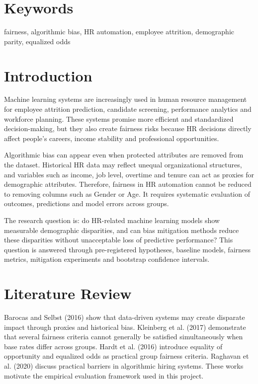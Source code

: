 \documentclass[12pt]{article}
\begin{document}
\section*{Keywords}
fairness, algorithmic bias, HR automation, employee attrition, demographic parity, equalized odds

\newpage

\section{Introduction}
Machine learning systems are increasingly used in human resource management for employee attrition prediction, candidate screening, performance analytics and workforce planning. These systems promise more efficient and standardized decision-making, but they also create fairness risks because HR decisions directly affect people's careers, income stability and professional opportunities.

Algorithmic bias can appear even when protected attributes are removed from the dataset. Historical HR data may reflect unequal organizational structures, and variables such as income, job level, overtime and tenure can act as proxies for demographic attributes. Therefore, fairness in HR automation cannot be reduced to removing columns such as Gender or Age. It requires systematic evaluation of outcomes, predictions and model errors across groups.

The research question is: do HR-related machine learning models show measurable demographic disparities, and can bias mitigation methods reduce these disparities without unacceptable loss of predictive performance? This question is answered through pre-registered hypotheses, baseline models, fairness metrics, mitigation experiments and bootstrap confidence intervals.

\section{Literature Review}
Barocas and Selbst (2016) show that data-driven systems may create disparate impact through proxies and historical bias. Kleinberg et al. (2017) demonstrate that several fairness criteria cannot generally be satisfied simultaneously when base rates differ across groups. Hardt et al. (2016) introduce equality of opportunity and equalized odds as practical group fairness criteria. Raghavan et al. (2020) discuss practical barriers in algorithmic hiring systems. These works motivate the empirical evaluation framework used in this project.
\end{document}
